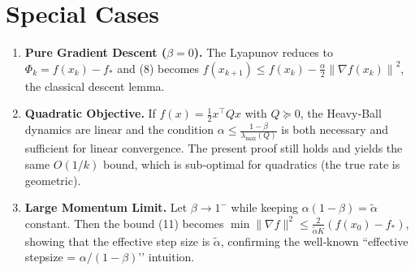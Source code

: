 \documentclass{article}
\newcommand{\norm}[1]{\left\lVert#1\right\rVert}
\begin{document}
\section*{Special Cases}
\begin{enumerate}
\item \textbf{Pure Gradient Descent ($\beta=0$).}  
The Lyapunov reduces to $\Phi_k=f(x_k)-f_*$ and (8) becomes
$f(x_{k+1})\le f(x_k)-\frac{\alpha}{2}\norm{\nabla f(x_k)}^2$, the classical descent lemma.

\item \textbf{Quadratic Objective.}  
If $f(x)=\frac12 x^\top Q x$ with $Q\succeq 0$, the Heavy‑Ball dynamics are linear and the condition $\alpha\le\frac{1-\beta}{\lambda_{\max}(Q)}$ is both necessary and sufficient for linear convergence. The present proof still holds and yields the same $O(1/k)$ bound, which is sub‑optimal for quadratics (the true rate is geometric).

\item \textbf{Large Momentum Limit.}  
Let $\beta\to 1^{-}$ while keeping $\alpha(1-\beta)=\tilde\alpha$ constant. Then the bound (11) becomes
$\min\|\nabla f\|^2\le \frac{2}{\tilde\alpha K}(f(x_0)-f_*)$, showing that the effective step size is $\tilde\alpha$, confirming the well‑known “effective stepsize = $\alpha/(1-\beta)$’’ intuition.
\end{enumerate}
\end{document}
